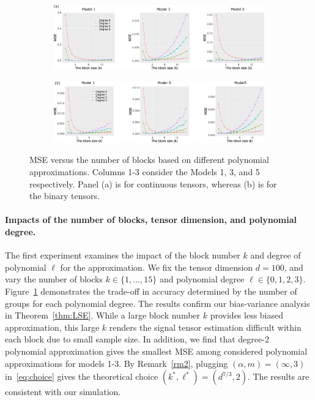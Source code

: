 \documentclass[12pt]{article}
\theoremstyle{definition}
\begin{document}
\begin{figure}[t!]
    \centering
    \begin{subfigure}[b]{.85\textwidth}
    \includegraphics[width = \textwidth]{figure/deg_conti.pdf}    
    \end{subfigure}
    
    \vspace{.5cm}
    
    \begin{subfigure}[b]{.85\textwidth}
    \includegraphics[width = \textwidth]{figure/deg_binary.pdf}    
    \end{subfigure}
    \caption{MSE versus the number of blocks based on different polynomial approximations. Columns 1-3 consider the Models 1, 3, and 5 respectively. Panel (a) is for continuous tensors, whereas (b) is for the binary tensors.}
    \label{fig:degk}
\end{figure}

\paragraph{Impacts of the number of blocks, tensor dimension, and polynomial degree.}
{\color{blue}The first experiment examines the impact of the block number $k$ and degree of polynomial $\ell$ for the approximation.} We fix the tensor dimension $d = 100$, and vary the number of blocks $k\in\{1,\ldots,15\}$ and polynomial degree $\ell\in\{0,1,2,3\}.$
{\color{blue}Figure~\ref{fig:degk} demonstrates the trade-off in accuracy determined by the number of groups for each polynomial degree. The results confirm our bias-variance analysis in Theorem~\ref{thm:LSE}. }While a large block number $k$ provides less biased approximation, this large $k$ renders the signal tensor estimation difficult within each block due to small sample size. {\color{blue}In addition, we find that degree-2 polynomial approximation gives the smallest MSE among considered polynomial approximations for models 1-3. By Remark~\ref{rm2}, plugging $(\alpha,m)=(\infty,3)$ in~\eqref{eq:choice} gives the theoretical choice $(k^*,\ell^*)=(d^{7/3},2)$. The results are consistent with our simulation. 
}
\end{document}
